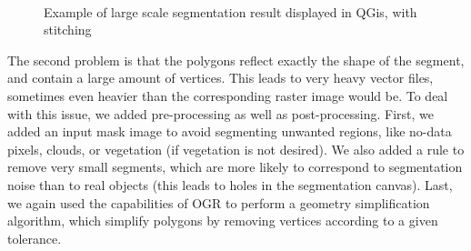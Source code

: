 \documentclass{josis}
\begin{document}
\begin{figure}[!htb]
\centering
{}\\
\caption{Example of large scale segmentation result displayed in QGis, with stitching}
\end{figure}

The second problem is that the polygons reflect exactly the shape of
the segment, and contain a large amount of vertices. This leads to
very heavy vector files, sometimes even heavier than the corresponding
raster image would be. To deal with this issue, we added
pre-processing as well as post-processing. First, we added an input
mask image to avoid segmenting unwanted regions, like no-data
pixels, clouds, or vegetation (if vegetation is not desired). We also
added a rule to remove very small segments, which are more likely to
correspond to segmentation noise than to real objects (this leads to
holes in the segmentation canvas). Last, we again used the
capabilities of OGR to perform a geometry simplification algorithm,
which simplify polygons by removing vertices according to a given
tolerance.
\end{document}
